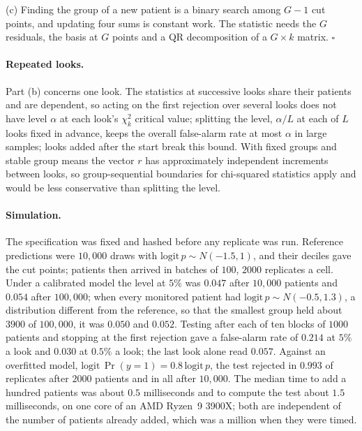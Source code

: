 \documentclass[11pt]{article}
\begin{document}
(c) Finding the group of a new patient is a binary search among $G-1$ cut points, and updating four sums
is constant work. The statistic needs the $G$ residuals, the basis at $G$ points and a QR decomposition of
a $G\times k$ matrix. \hfill$\square$

\paragraph{Repeated looks.} Part (b) concerns one look. The statistics at successive looks share their
patients and are dependent, so acting on the first rejection over several looks does not have level
$\alpha$ at each look's $\chi^2_k$ critical value; splitting the level, $\alpha/L$ at each of $L$ looks
fixed in advance, keeps the overall false-alarm rate at most $\alpha$ in large samples; looks added
after the start break this bound. With fixed groups and stable group means the vector $r$ has
approximately independent increments between looks, so group-sequential boundaries for chi-squared
statistics \citep[chapter 15]{jennison2000group} apply and would be less conservative than splitting
the level.

\paragraph{Simulation.} The specification was fixed and hashed before any replicate was run. Reference
predictions were $10{,}000$ draws with $\mathrm{logit}\,p\sim N(-1.5,1)$, and their deciles gave the cut
points; patients then arrived in batches of $100$, $2000$ replicates a cell. Under a calibrated model the
level at $5\%$ was $0.047$ after $10{,}000$ patients and $0.054$ after $100{,}000$; when every monitored
patient had $\mathrm{logit}\,p\sim N(-0.5,1.3)$, a distribution different from the reference, so that the
smallest group held about $3900$ of $100{,}000$, it was $0.050$ and $0.052$. Testing after each of ten blocks of $1000$ patients and stopping at the first
rejection gave a false-alarm rate of $0.214$ at $5\%$ a look and $0.030$ at $0.5\%$ a look; the last
look alone read $0.057$. Against an overfitted model, $\mathrm{logit}\,\Pr(y=1)=0.8\,\mathrm{logit}\,p$,
the test rejected in $0.993$ of replicates after $2000$ patients and in all after $10{,}000$. The median time to add a hundred patients was about $0.5$
milliseconds and to compute the test about $1.5$ milliseconds, on one core of an AMD Ryzen~9 3900X; both
are independent of the number of patients already added, which was a million when they were timed.
\end{document}
